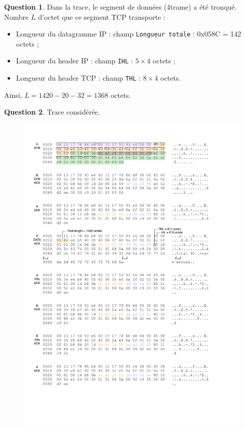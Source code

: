 \documentclass[11pt,english,french]{scrreprt}
\theoremstyle{remark}
\theoremstyle{definition}
\newtheorem{ques}{Question}[section]
\begin{document}
\begin{ques}
	Dans la trace, le segment de données (4\ieme trame) a été tronqué. Nombre $L$ d'octet que ce segment TCP transporte :\begin{itemize}
		\item Longueur du datagramme IP : champ \lstinline!Longueur totale! : 0x058C = 142 octets ;
		\item Longueur du header IP : champ \lstinline!IHL! : $5\times 4$ octets ;
		\item Longueur du header TCP : champ \lstinline!THL! : $8\times 4$ octets.
	\end{itemize}
	
	Ainsi, $L = 1420 - 20 - 32 = 1368$ octets.
\end{ques}

\begin{ques}
	Trace considérée.
	
	\begin{figure}[h!]
		\center
		\includegraphics[scale=1.1]{Exam2009/trace}
	\end{figure}
\end{ques}
\end{document}
